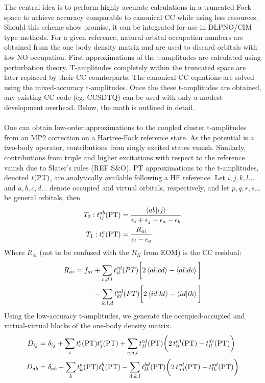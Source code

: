 The central idea is to perform highly accurate calculations in a truncated Fock space to achieve accuracy comparable to canonical CC while using less resources.  Should this scheme show promise, it can be integrated for use in DLPNO/CIM type methods. For a given reference, natural orbital occupation numbers are obtained from the one body density matrix and are used to discard orbitals with low NO occupation. First approximations of the t-amplitudes are calculated using perturbation theory. T-amplitudes completely within the truncated space are later replaced by their CC counterparts. The canonical CC equations are solved using the mixed-accuracy t-amplitudes. Once the these t-amplitudes are obtained, any existing CC code (eg. CCSDTQ) can be used with only a modest development overhead. Below, the math is outlined in detail. \\\\
One can obtain low-order approximations to the coupled cluster t-amplitudes from an MP2 correction on a Hartree-Fock reference state. As the potential is a two-body operator, contributions from singly excited states vanish. Similarly, contributions from triple and higher excitations with respect to the reference vanish due to Slater's rules (REF S\&O). PT approximations to the t-amplitudes, denoted $t\text{(PT)}$, are analytically available following a HF reference. Let $i,j,k,l...$ and $a,b,c,d ...$ denote occupied and virtual orbitals, respectively, and let  $p,q,r,s...$ be general orbitals, then  
\begin{align}
T_2: t_{ij}^{ab}\text{(PT)}&= \frac{
	\braket{ab|ij}}
	{\epsilon_i + \epsilon_j - \epsilon_a - \epsilon_b}	\\
T_1:t_i^a\text{(PT)}&= \frac{R_{ai}}{\epsilon_i - \epsilon_a}
\end{align}
Where $R_{ai}$ (not to be confused with the $R_K$ from EOM) is the CC residual: 
\begin{align}
\begin{split}
R_{ai} =f_{ai} &+ \sum_{c,d,l} t_{il}^{cd}(PT) \bigg[2 \braket{al|cd} - \braket{al|dc} \bigg] \\ & - \sum_{k,l,d} t_{kl}^{ad}(PT) \bigg[2 \braket{id|kl} - \braket{id|lk} \bigg]
\end{split}
\end{align}
Using the low-accuracy t-amplitudes, we generate the occupied-occupied and virtual-virtual blocks of the one-body density matrix.
\begin{align}
D_{ij} &= \delta_{ij} + \sum_c t_i^c\text{(PT)} t_j^c\text{(PT)} + \sum_{c,d,l} t_{jl}^{cd}\text{(PT)} \bigg(2 \, t_{il}^{cd}\text{(PT)} - t_{il}^{dc}\text{(PT)}\bigg)\label{eq:D_occ_occ}\\
D_{ab} &= \delta_{ab} - \sum_k t_k^a\text{(PT)} t_k^b\text{(PT)} - \sum_{d,k,l} t_{lk}^{bd}\text{(PT)} \bigg(2 \, t_{ad}^{cd}\text{(PT)} - t_{lk}^{ad}\text{(PT)}\bigg)\label{eq:D_vrt_vrt}
\end{align} 

